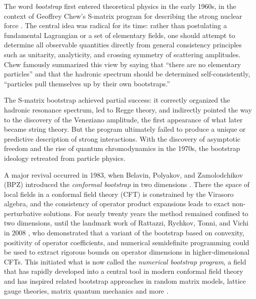 \documentclass[11pt]{article}
\theoremstyle{plain}
\begin{document}
The word \emph{bootstrap} first entered   theoretical physics in the early 1960s, in the context of Geoffrey Chew's S-matrix program for describing the strong nuclear force \cite{Chew1962}. The central idea was radical for its time: rather than postulating a fundamental Lagrangian or a set of elementary fields, one should attempt to determine all observable quantities directly from general consistency principles such as unitarity, analyticity, and crossing symmetry of scattering amplitudes. Chew famously summarized this view by saying that ``there are no elementary particles'' and that the hadronic spectrum should be determined self-consistently, ``particles pull themselves up by their own bootstraps.''

The S-matrix bootstrap achieved partial success: it correctly organized the hadronic resonance spectrum, led to Regge theory, and indirectly pointed the way to the discovery of the Veneziano amplitude, the first appearance of what later became string theory. But the program ultimately failed to produce a unique or predictive description of strong interactions. With the discovery of asymptotic freedom and the rise of quantum chromodynamics in the 1970s, the bootstrap ideology retreated from particle physics.

A major revival occurred in 1983, when Belavin, Polyakov, and Zamolodchikov (BPZ) introduced the \emph{conformal bootstrap} in two dimensions \cite{BPZ1984}. There the space of local fields in a conformal field theory (CFT) is constrained by the Virasoro algebra, and the consistency of operator product expansions leads to exact non-perturbative solutions. For nearly twenty years the method remained confined to two dimensions, until the landmark work of Rattazzi, Rychkov, Tonni, and Vichi in 2008 \cite{RRTV}, who demonstrated that a variant of the bootstrap based on convexity, positivity of operator coefficients, and numerical semidefinite programming could be used to extract rigorous bounds on operator dimensions in higher-dimensional CFTs. This initiated what is now called the \emph{numerical bootstrap program}, a field that has rapidly developed into a central tool in modern conformal field theory and has inspired related bootstrap approaches in random matrix models, lattice gauge theories, matrix quantum mechanics and more \cite{bootstraps,bootstraps Kazakov,bootstraps matrix quantum mechancis cho,bootstraps Li lattice gauge,bootstraps Guo lattice yang-mills,bootstraps Kazakov finite lattice,boostraps lattice yang mills,bootstraps Li analytic trajectory,bootstraps Li Yang-Mills matrix integrals}.
\end{document}
